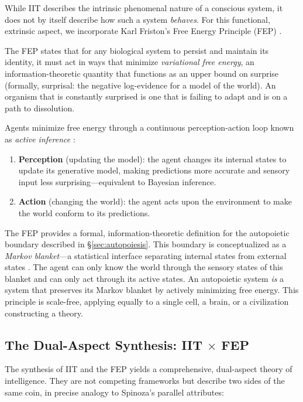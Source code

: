 \documentclass[12pt,a4paper]{article}
\begin{document}
While IIT describes the intrinsic phenomenal nature of a conscious system,
it does not by itself describe how such a system \emph{behaves}.  For this
functional, extrinsic aspect, we incorporate Karl Friston's Free Energy
Principle (FEP) \citep{friston2010,friston2019}.

The FEP states that for any biological system to persist and maintain its
identity, it must act in ways that minimize \emph{variational free energy},
an information-theoretic quantity that functions as an upper bound on
surprise (formally, surprisal: the negative log-evidence for a model of the
world).  An organism that is constantly surprised is one that is failing to
adapt and is on a path to dissolution.

Agents minimize free energy through a continuous perception-action loop
known as \emph{active inference} \citep{parr2022}:
\begin{enumerate}[label=(\alph*)]
    \item \textbf{Perception} (updating the model): the agent changes its
        internal states to update its generative model, making predictions
        more accurate and sensory input less surprising---equivalent to
        Bayesian inference.
    \item \textbf{Action} (changing the world): the agent acts upon the
        environment to make the world conform to its predictions.
\end{enumerate}

The FEP provides a formal, information-theoretic definition for the
autopoietic boundary described in \S\ref{sec:autopoiesis}.  This boundary
is conceptualized as a \emph{Markov blanket}---a statistical interface
separating internal states from external states
\citep{friston2013,kirchhoff2018}.  The agent can only know the world
through the sensory states of this blanket and can only act through its
active states.  An autopoietic system \emph{is} a system that preserves
its Markov blanket by actively minimizing free energy.  This principle is
scale-free, applying equally to a single cell, a brain, or a civilization
constructing a theory.

\subsection{The Dual-Aspect Synthesis: IIT $\times$ FEP}
\label{sec:dual}

The synthesis of IIT and the FEP yields a comprehensive, dual-aspect theory
of intelligence.  They are not competing frameworks but describe two sides
of the same coin, in precise analogy to Spinoza's parallel attributes:
\end{document}
